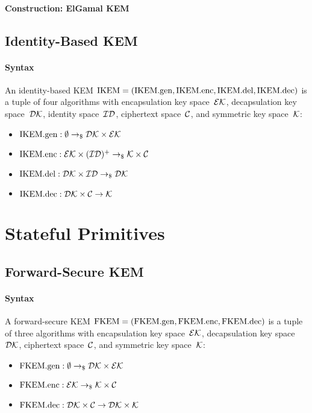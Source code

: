 \documentclass[a4paper,orivec]{llncs}
\begin{document}
\paragraph{Construction: ElGamal KEM}


\subsection{Identity-Based KEM}

\paragraph{Syntax}
An identity-based KEM $\mathrm{IKEM}=(\mathrm{IKEM}.\mathrm{gen},\mathrm{IKEM}.\mathrm{enc},\mathrm{IKEM}.\mathrm{del},\mathrm{IKEM}.\mathrm{dec})$ is a tuple of four algorithms with encapsulation key space~$\mathcal{EK}$, decapsulation key space~$\mathcal{DK}$, identity space~$\mathcal{ID}$, ciphertext space~$\mathcal{C}$, and symmetric key space~$\mathcal{K}$:

\begin{itemize}
    \item $\mathrm{IKEM}.\mathrm{gen}: \emptyset \to_\$ \mathcal{DK}\times\mathcal{EK}$
    \item $\mathrm{IKEM}.\mathrm{enc}: \mathcal{EK}\times(\mathcal{ID})^+ \to_\$ \mathcal{K}\times\mathcal{C}$
    \item $\mathrm{IKEM}.\mathrm{del}: \mathcal{DK}\times\mathcal{ID} \to_\$ \mathcal{DK}$
    \item $\mathrm{IKEM}.\mathrm{dec}: \mathcal{DK}\times\mathcal{C} \to \mathcal{K}$
\end{itemize}


\section{Stateful Primitives}

\subsection{Forward-Secure KEM}

\paragraph{Syntax}
A forward-secure KEM $\mathrm{FKEM}=(\mathrm{FKEM}.\mathrm{gen},\mathrm{FKEM}.\mathrm{enc},\mathrm{FKEM}.\mathrm{dec})$ is a tuple of three algorithms with encapsulation key space~$\mathcal{EK}$, decapsulation key space~$\mathcal{DK}$, ciphertext space~$\mathcal{C}$, and symmetric key space~$\mathcal{K}$:

\begin{itemize}
    \item $\mathrm{FKEM}.\mathrm{gen}: \emptyset \to_\$ \mathcal{DK}\times\mathcal{EK}$
    \item $\mathrm{FKEM}.\mathrm{enc}: \mathcal{EK} \to_\$ \mathcal{K}\times\mathcal{C}$
    \item $\mathrm{FKEM}.\mathrm{dec}: \mathcal{DK}\times\mathcal{C} \to \mathcal{DK}\times\mathcal{K}$
\end{itemize}
\end{document}
